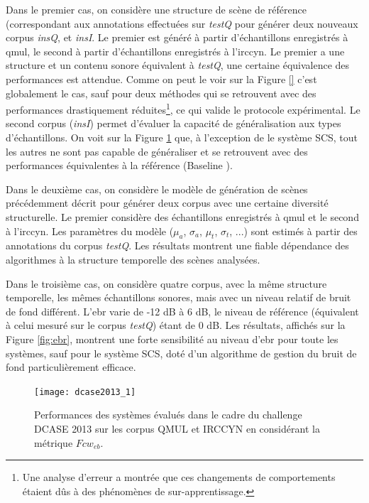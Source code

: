   Dans le premier cas, on considère une structure de scène de référence (correspondant aux annotations effectuées sur \emph{testQ} pour générer deux nouveaux corpus \emph{insQ}, et \emph{insI}. Le premier est généré à partir d'échantillons enregistrés à qmul, le second à partir d'échantillons enregistrés à l'irccyn. Le premier a une structure et un contenu sonore équivalent à \emph{testQ}, une certaine équivalence des performances est attendue. Comme on peut le voir sur la Figure \ref{} c'est globalement le cas, sauf pour deux méthodes qui se retrouvent avec des performances drastiquement réduites\footnote{Une analyse d'erreur a montrée que ces changements de comportements étaient dûs à des phénomènes de sur-apprentissage\cite{lafayhal-01111381}.}, ce qui valide le protocole expérimental. Le second corpus (\emph{insI}) permet d'évaluer la capacité de généralisation aux types d'échantillons. On voit sur la Figure \ref{fig:irccyn} que, à l'exception de le système SCS, tout les autres ne sont pas capable de généraliser et se retrouvent avec des performances équivalentes à la référence (\og Baseline \fg).

  Dans le deuxième cas, on considère le modèle de génération de scènes précédemment décrit pour générer deux corpus avec une certaine diversité structurelle. Le premier considère des échantillons enregistrés à qmul et le second à l'irccyn. Les paramètres du modèle ($\mu_a$, $\sigma_a$, $\mu_t$, $\sigma_t$, ...) sont estimés à partir des annotations du corpus \emph{testQ}. Les résultats montrent une fiable dépendance des algorithmes à la structure temporelle des scènes analysées.

  Dans le troisième cas, on considère quatre corpus, avec la même structure temporelle, les mêmes échantillons sonores, mais avec un niveau relatif de bruit de fond différent. L'ebr varie de -12 dB à 6 dB, le niveau de référence (équivalent à celui mesuré sur le corpus \emph{testQ})  étant de 0 dB. Les résultats, affichés sur la Figure \ref{fig:ebr}, montrent une forte sensibilité au niveau d'ebr pour toute les systèmes, sauf pour le système SCS, doté d'un algorithme de gestion du bruit de fond particulièrement efficace.

  \begin{figure}[t]
  \texttt{[image: dcase2013\_1]}
  \caption{Performances des systèmes évalués dans le cadre du challenge DCASE 2013 sur les corpus QMUL et IRCCYN en considérant la métrique $Fcw_{eb}$.}
  \label{fig:irccyn}
  \end{figure}

